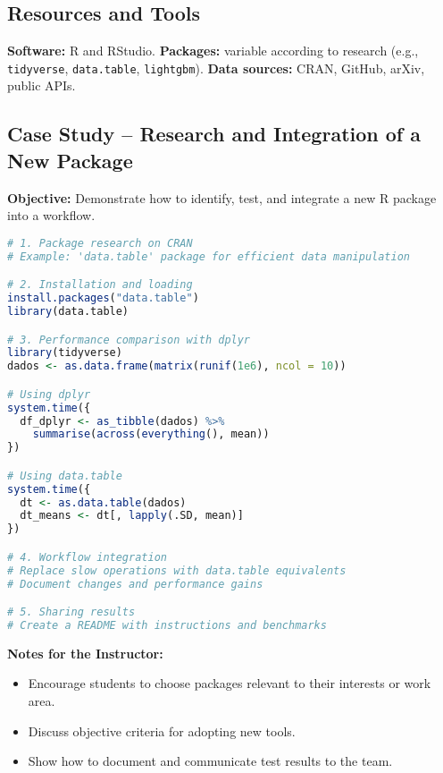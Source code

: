 \subsection{\textcolor{subsectionblue}{Resources and Tools}}
\begin{itemize}
  \textbf{Software:} R and RStudio.
  \textbf{Packages:} variable according to research (e.g., \texttt{tidyverse}, \texttt{data.table}, \texttt{lightgbm}).
  \textbf{Data sources:} CRAN, GitHub, arXiv, public APIs.
\end{itemize}

\subsection{\textcolor{subsectionblue}{Case Study – Research and Integration of a New Package}}
\textbf{Objective:} Demonstrate how to identify, test, and integrate a new R package into a workflow.

\begin{lstlisting}[language=R]
# 1. Package research on CRAN
# Example: 'data.table' package for efficient data manipulation

# 2. Installation and loading
install.packages("data.table")
library(data.table)

# 3. Performance comparison with dplyr
library(tidyverse)
dados <- as.data.frame(matrix(runif(1e6), ncol = 10))

# Using dplyr
system.time({
  df_dplyr <- as_tibble(dados) %>%
    summarise(across(everything(), mean))
})

# Using data.table
system.time({
  dt <- as.data.table(dados)
  dt_means <- dt[, lapply(.SD, mean)]
})

# 4. Workflow integration
# Replace slow operations with data.table equivalents
# Document changes and performance gains

# 5. Sharing results
# Create a README with instructions and benchmarks
\end{lstlisting}

\textbf{Notes for the Instructor:}
\begin{itemize}
  \item Encourage students to choose packages relevant to their interests or work area.
  \item Discuss objective criteria for adopting new tools.
  \item Show how to document and communicate test results to the team.
\end{itemize}